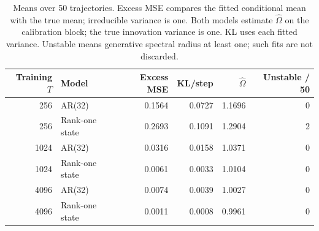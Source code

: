 \begin{table}[htbp]
\centering\small
\begin{tabular}{rlrrrr}\toprule
Training \(T\) & Model & Excess MSE & KL/step & \(\widehat\Omega\) & Unstable / 50\\\midrule
256 & AR(32) & 0.1564 & 0.0727 & 1.1696 & 0\\
256 & Rank-one state & 0.2693 & 0.1091 & 1.2904 & 2\\
1024 & AR(32) & 0.0316 & 0.0158 & 1.0371 & 0\\
1024 & Rank-one state & 0.0061 & 0.0033 & 1.0104 & 0\\
4096 & AR(32) & 0.0074 & 0.0039 & 1.0027 & 0\\
4096 & Rank-one state & 0.0011 & 0.0008 & 0.9961 & 0\\
\bottomrule\end{tabular}
\caption{Means over 50 trajectories. Excess MSE compares the fitted
conditional mean with the true mean; irreducible variance is one.
Both models estimate \(\widehat\Omega\) on the calibration block; the true
innovation variance is one. KL uses each fitted variance. Unstable means generative
spectral radius at least one; such fits are not discarded.}
\label{tab:l5-synthetic}
\end{table}
